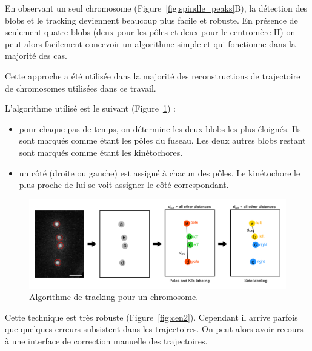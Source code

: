 \documentclass[12pt,a4paper,twoside,openright]{book}
\begin{document}
En observant un seul chromosome (Figure~\ref{fig:spindle_peaks}B), la
détection des blobs et le tracking deviennent beaucoup plus facile et
robuste. En présence de seulement quatre blobs (deux pour les pôles et
deux pour le centromère II) on peut alors facilement concevoir un
algorithme simple et qui fonctionne dans la majorité des cas.

Cette approche a été utilisée dans la majorité des reconstructions de
trajectoire de chromosomes utilisées dans ce travail.

L'algorithme utilisé est le suivant (Figure~\ref{fig:algo_cen2}) :

\begin{itemize}
\item
  pour chaque pas de temps, on détermine les deux blobs les plus
  éloignés. Ils sont marqués comme étant les pôles du fuseau. Les deux
  autres blobs restant sont marqués comme étant les kinétochores.
\item
  un côté (droite ou gauche) est assigné à chacun des pôles. Le
  kinétochore le plus proche de lui se voit assigner le côté
  correspondant.
\end{itemize}

\begin{figure}[htbp]
\centering
\includegraphics{figures/results/imaging/algo_cen2.png}
\caption[Algorithme de tracking pour un chromosome]{\label{fig:algo_cen2}Algorithme
de tracking pour un chromosome.}
\end{figure}

Cette technique est très robuste (Figure~\ref{fig:cen2}). Cependant il
arrive parfois que quelques erreurs subsistent dans les trajectoires. On
peut alors avoir recours à une interface de correction manuelle des
trajectoires.
\end{document}

